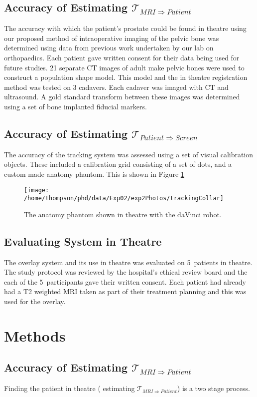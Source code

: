 \documentclass[3p,twocolumn,preprint,10pt]{elsarticle}
\newcommand{\n}{5}
\newcommand{\Tpreop}{$\mathcal{T}_{MRI \Rightarrow Patient}$}
\newcommand{\Tlens}{$\mathcal{T}_{Patient \Rightarrow Screen}$}
\begin{document}
\subsection{Accuracy of Estimating \Tpreop}
The accuracy with which the patient's prostate could be found in theatre using our 
proposed method of intraoperative imaging of the pelvic bone was determined using
data from previous work undertaken by our lab on orthopaedics. Each patient gave written
consent for 
their data being used for future studies. 21 separate CT images of adult make pelvic bones
were used to construct a population shape model. 
This model and the in theatre registration method
was tested on 3 cadavers. Each cadaver was imaged with CT and ultrasound.
A gold standard transform between these images was determined using 
a set of bone implanted fiducial markers.
\subsection{Accuracy of Estimating \Tlens}
The accuracy of the tracking system was assessed using a set of visual calibration objects.
These included a calibration grid consisting of a set of dots, and a custom made
anatomy phantom. This is shown in Figure \ref{fig:Phantom}
\begin{figure}
\begin{center}
\texttt{[image: /home/thompson/phd/data/Exp02/exp2Photos/trackingCollar]}
\end{center}
\caption{\label{fig:Phantom}The anatomy phantom shown in theatre with the daVinci robot.}
\end{figure}
\subsection{Evaluating System in Theatre}
The overlay system and its use in theatre was evaluated on \n \ patients in theatre.
The study protocol was reviewed by the hospital's ethical review board and the each of 
the \n \ participants gave their written consent. Each patient had already had a T2 weighted
MRI taken as part of their treatment planning and this was used for the overlay. 
\section{Methods}
\subsection{Accuracy of Estimating \Tpreop}
Finding the patient in theatre ( estimating \Tpreop ) is a 
two stage process. 
\end{document}
